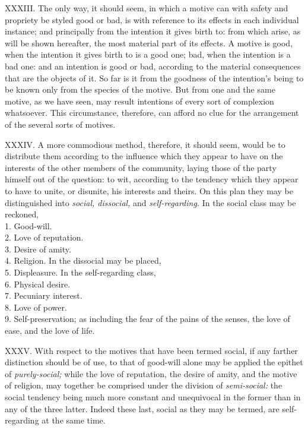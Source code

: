 \documentclass[12pt]{report}
\begin{document}
XXXIII. The only way, it should seem, in which a motive can with safety
and propriety be styled good or bad, is with reference to its effects in
each individual instance; and principally from the intention it gives
birth to: from which arise, as will be shown hereafter, the most
material part of its effects. A motive is good, when the intention it
gives birth to is a good one; bad, when the intention is a bad one: and
an intention is good or bad, according to the material consequences that
are the objects of it. So far is it from the goodness of the intention's
being to be known only from the species of the motive. But from one and
the same motive, as we have seen, may result intentions of every sort of
complexion whatsoever. This circumstance, therefore, can afford no clue
for the arrangement of the several sorts of motives.

XXXIV. A more commodious method, therefore, it should seem, would be to
distribute them according to the influence which they appear to have on
the interests of the other members of the community, laying those of the
party himself out of the question: to wit, according to the tendency
which they appear to have to unite, or disunite, his interests and
theirs. On this plan they may be distinguished into \emph{social,
dissocial,} and \emph{self-regarding.} In the social class may be
reckoned,\\
1. Good-will.\\
2. Love of reputation.\\
3. Desire of amity.\\
4. Religion. In the dissocial may be placed,\\
5. Displeasure. In the self-regarding class,\\
6. Physical desire.\\
7. Pecuniary interest.\\
8. Love of power.\\
9. Self-preservation; as including the fear of the pains of the senses,
the love of ease, and the love of life.

XXXV. With respect to the motives that have been termed social, if any
farther distinction should be of use, to that of good-will alone may be
applied the epithet of \emph{purely-social;} while the love of
reputation, the desire of amity, and the motive of religion, may
together be comprised under the division of \emph{semi-social:} the
social tendency being much more constant and unequivocal in the former
than in any of the three latter. Indeed these last, social as they may
be termed, are self-regarding at the same time.\\
\end{document}
